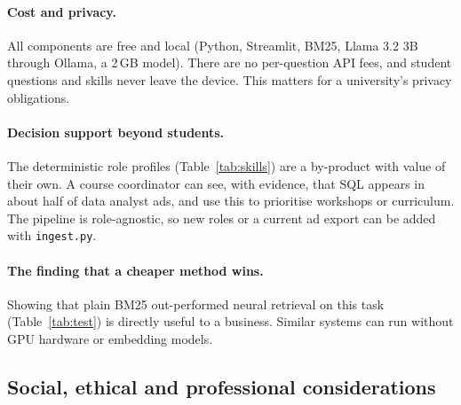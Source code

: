 \paragraph{Cost and privacy.} All components are free and local (Python, Streamlit, BM25, Llama 3.2 3B through Ollama, a 2\,GB model). There are no per-question API fees, and student questions and skills never leave the device. This matters for a university's privacy obligations.

\paragraph{Decision support beyond students.} The deterministic role profiles (Table~\ref{tab:skills}) are a by-product with value of their own. A course coordinator can see, with evidence, that SQL appears in about half of data analyst ads, and use this to prioritise workshops or curriculum. The pipeline is role-agnostic, so new roles or a current ad export can be added with \texttt{ingest.py}.

\paragraph{The finding that a cheaper method wins.} Showing that plain BM25 out-performed neural retrieval on this task (Table~\ref{tab:test}) is directly useful to a business. Similar systems can run without GPU hardware or embedding models.

\subsection{Social, ethical and professional considerations}

